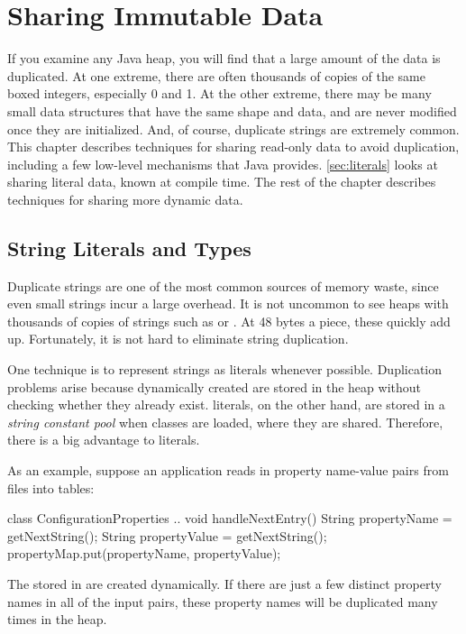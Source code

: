 \chapter{Sharing Immutable Data}
\label{chapter:sharing-immutable-data}

If you examine any Java
heap, you will find that a
large amount of the data is duplicated. At one extreme, 
there are often thousands of copies of the same boxed
integers, especially 0 and 1. At the other extreme, there may be many
small data structures that have the same shape and data, and are never modified
once they are initialized. And, of course, duplicate strings are extremely common.
This chapter describes
techniques for sharing read-only data to avoid
duplication, including a few low-level mechanisms that Java provides.
\autoref{sec:literals} looks at sharing literal data, known at compile time. 
The rest of the chapter describes techniques for sharing more
dynamic data.

\section{String Literals and  Types}
\label{sec:literals}

Duplicate strings are one of the
most common sources of memory waste, since even
small strings incur a large overhead. It is not uncommon to
see heaps with thousands of copies of strings such as  or
. At 48 bytes a piece, these quickly add up.
Fortunately, it is not hard to eliminate string duplication.

One technique is to represent strings as  
literals whenever possible. Duplication problems arise because dynamically
 created 
are stored in the heap without checking whether they already
exist.  literals, on the other hand, are stored in a
\emph{string constant pool} when classes
are loaded, where they are shared. Therefore,
there is a big advantage to  literals.

As an example, suppose an application
reads in property name-value pairs from files into tables:
\begin{shortlisting}
class ConfigurationProperties {
    ..
	void handleNextEntry() {
		String propertyName = getNextString();
		String propertyValue = getNextString();
		propertyMap.put(propertyName, propertyValue);
	}
}
\end{shortlisting}
The  stored in  are created dynamically. If 
there are just a few distinct property names in all of the input pairs, these
property names will be duplicated many times in the heap.


